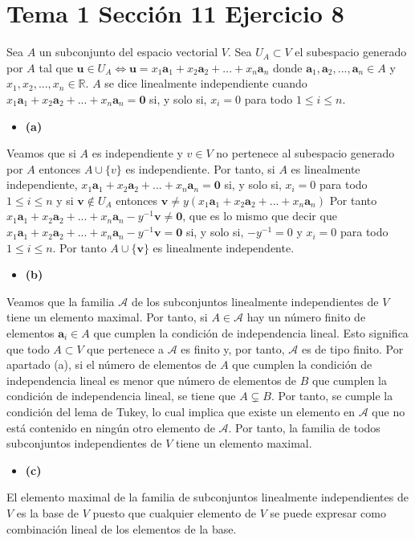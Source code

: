 \documentclass{article}
\newcommand{\vect}[1]{\boldsymbol{#1}}
\begin{document}
\section{Tema 1 Sección 11 Ejercicio 8}
Sea $A$ un subconjunto del espacio vectorial $V$. Sea $U_A\subset V$ el subespacio generado por $A$ tal que $\vect{u}\in U_A\Leftrightarrow \vect{u}=x_1\vect{a}_1+x_2\vect{a}_2+...+x_n\vect{a}_n$ donde $\vect{a}_1,\vect{a}_2,..., \vect{a}_n\in A$ y $x_1,x_2,...,x_n\in \mathbb{R}$.
$A$ se dice linealmente independiente cuando $x_1\vect{a}_1+x_2\vect{a}_2+...+x_n\vect{a}_n=\vect{0}$  si, y solo si, $x_i=0$ para todo $1\leq i \leq n$.
\begin{itemize}
\item \bf (a) \rm
\end{itemize}
Veamos que si $A$ es independiente y $v\in V$ no pertenece al subespacio generado por $A$ entonces $A\cup \{v\}$ es independiente. Por tanto, si $A$ es linealmente independiente, $x_1\vect{a}_1+x_2\vect{a}_2+...+x_n\vect{a}_n=\vect{0}$  si, y solo si, $x_i=0$ para todo $1\leq i \leq n$ y si $\vect{v}\notin U_A$ entonces $\vect{v}\neq y(x_1\vect{a}_1+x_2\vect{a}_2+...+x_n\vect{a}_n)$ Por tanto $ x_1\vect{a}_1+x_2\vect{a}_2+...+x_n\vect{a}_n-y^{-1}\vect{v}\neq \vect{0}$, que es lo mismo que decir que 
$x_1\vect{a}_1+x_2\vect{a}_2+...+x_n\vect{a}_n-y^{-1}\vect{v}=\vect{0}$ si, y solo si, $-y^{-1}=0$ y $x_i=0$ para todo $1\leq i \leq n$. Por tanto $A\cup\{\vect{v}\}$ es linealmente independente.
\begin{itemize}
\item \bf (b) \rm
\end{itemize}
Veamos que la familia $\mathcal{A}$ de los subconjuntos linealmente independientes de $V$
tiene un elemento maximal. Por tanto, si $A\in \mathcal{A}$ hay un número finito de elementos $\vect{a}_i\in A$ que cumplen la condición de independencia lineal. Esto significa que todo $A\subset V$ que pertenece a $\mathcal{A}$ es finito y, por tanto, $\mathcal{A}$ es de tipo finito. Por apartado (a), si el número de elementos de $A$ que cumplen la condición de independencia lineal es menor que número de elementos de $B$ que cumplen la condición de independencia lineal, se tiene que $A\subsetneq B$. Por tanto, se cumple la condición del lema de Tukey, lo cual implica que existe un elemento en $\mathcal{A}$ que no está contenido en ningún otro elemento de $\mathcal{A}$. Por tanto, la familia de todos subconjuntos independientes de $V$ tiene un elemento maximal.
\begin{itemize}
\item \bf (c) \rm
\end{itemize}
El elemento maximal de la familia de subconjuntos linealmente independientes de $V$ es la base de $V$ puesto que cualquier elemento de $V$ se puede expresar como combinación lineal de los elementos de la base.
\end{document}
